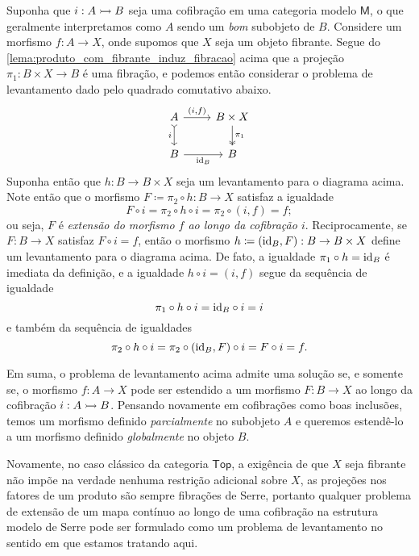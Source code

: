 \begin{exem}
  \label{exem:extensao_ao_longo_de_cofibracao_como_levantamento}
  Suponha que $i: A \rightarrowtail B$ seja uma cofibração em uma categoria modelo $\mathsf{M}$, o que geralmente interpretamos como $A$ sendo um \emph{bom} subobjeto de $B$.
  Considere um morfismo $f: A \to X$, onde supomos que $X$ seja um objeto fibrante.
  Segue do \cref{lema:produto_com_fibrante_induz_fibracao} acima que a projeção $\pi_{1}: B \times X \to B$ é uma fibração, e podemos então considerar o problema de levantamento dado pelo quadrado comutativo abaixo.
  \begin{displaymath}
    \begin{tikzcd}
      A
      \arrow[d, tail, "i" swap]
      \arrow[r, "{(i,f)}"]
      & B \times X
      \arrow[d, two heads, "\pi_{1}"]
      \\ B
      \arrow[r, "\id_{B}" swap]
      & B
    \end{tikzcd}
  \end{displaymath}
  Suponha então que $h: B \to B \times X$ seja um levantamento para o diagrama acima.
  Note então que o morfismo $F \coloneqq \pi_{2} \circ h: B \to X$ satisfaz a igualdade
  \begin{displaymath}
    F \circ i = \pi_{2} \circ h \circ i = \pi_{2} \circ (i,f) = f;
  \end{displaymath}
  ou seja, $F$ é \emph{extensão do morfismo $f$ ao longo da cofibração $i$}.
  Reciprocamente, se $F: B \to X$ satisfaz $F \circ i = f$, então o morfismo $h \coloneqq (\mathrm{id}_{B},F): B \to B \times X$ define um levantamento para o diagrama acima.
  De fato, a igualdade $\pi_{1} \circ h = \mathrm{id}_{B}$ é imediata da definição, e a igualdade $h \circ i = (i,f)$ segue da sequência de igualdade
  \begin{displaymath}
    \pi_{1} \circ h \circ i = \mathrm{id}_{B} \circ i = i
  \end{displaymath}
  e também da sequência de igualdades
  \begin{displaymath}
    \pi_{2} \circ h \circ i = \pi_{2} \circ (\mathrm{id}_{B},F) \circ i = F \circ i = f.
  \end{displaymath}

  Em suma, o problema de levantamento acima admite uma solução se, e somente se, o morfismo $f: A \to X$ pode ser estendido a um morfismo $F: B \to X$ ao longo da cofibração $i: A \rightarrowtail B$.
  Pensando novamente em cofibrações como boas inclusões, temos um morfismo definido \emph{parcialmente} no subobjeto $A$ e queremos estendê-lo a um morfismo definido \emph{globalmente} no objeto $B$.

  Novamente, no caso clássico da categoria $\mathsf{Top}$, a exigência de que $X$ seja fibrante não impõe na verdade nenhuma restrição adicional sobre $X$, as projeções nos fatores de um produto são sempre fibrações de Serre, portanto qualquer problema de extensão de um mapa contínuo ao longo de uma cofibração na estrutura modelo de Serre pode ser formulado como um problema de levantamento no sentido em que estamos tratando aqui.
\end{exem}

